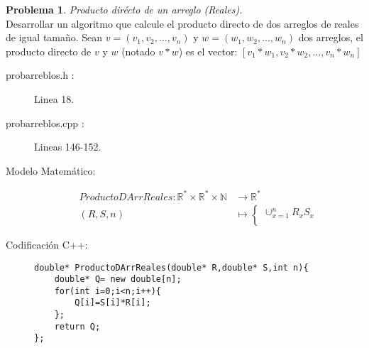 \documentclass{article}
\theoremstyle{plain}
\theoremstyle{definition}
\newtheorem{problem}{Problema}
\begin{document}
\begin{problem} \emph{Producto dirécto de un arreglo (Reales).}\\
\hspace*{7mm}Desarrollar un algoritmo que calcule el producto directo de dos arreglos de reales de igual tamaño. Sean $v=(v_1,v_2,..., v_n)$ y $w=(w_1,w_2,..., w_n)$ dos arreglos, el producto directo de $v$ y $w$ (notado $v*w$) es el vector: $[v_1 * w_1 , v_2*w_2 ,..., v_n * w_n]$
\begin{description}
\item[probarreblos.h :] Linea 18. \item[probarreblos.cpp :] Lineas 146-152.

\item[Modelo Matemático:]
\begin{align*}
ProductoDArrReales: \mathbb{R}^{*}\times\mathbb{R}^{*}\times\mathbb{N} &\to \mathbb{R}^{*}\\
(R,S,n) &\mapsto
\begin{cases}
\cup_{x=1}^n R_xS_x\\
\end{cases}
\end{align*}
%
\item[Codificación \textsf{C++}:]\hfill
%
\begin{verbatim}
double* ProductoDArrReales(double* R,double* S,int n){
    double* Q= new double[n];
    for(int i=0;i<n;i++){
        Q[i]=S[i]*R[i];
    };
    return Q;
};
\end{verbatim}
\end{description}
\end{problem}
\end{document}

